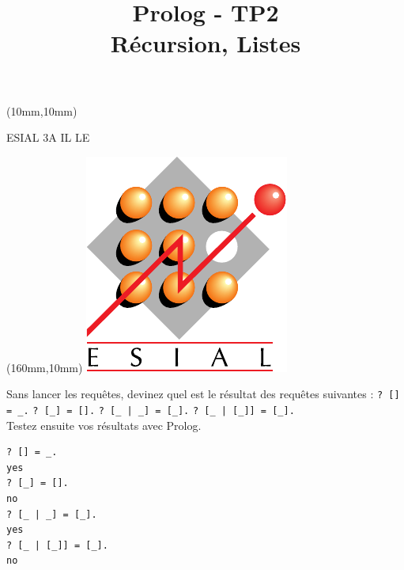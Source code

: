 \documentclass[a4paper]{article}
\title{Prolog - TP2\\Récursion, Listes}
\date{}
\newenvironment{CAnswer}{\color{red}\begin{Answer}}
                        {\end{Answer}}
\begin{document}
\maketitle
\begin{textblock*}{4cm}(10mm,10mm)
\begin{Large}ESIAL 3A IL LE\end{Large}
\end{textblock*}
\begin{textblock*}{3cm}(160mm,10mm)
\includegraphics[width=\textwidth]{../../ESIAL.pdf}
\end{textblock*}

\begin{Exercise}[title={Quelques tests}]
Sans lancer les requêtes, devinez quel est le résultat des requêtes suivantes :
\Question \verb$?­ [] = _.$
\Question \verb$?­ [_] = [].$
\Question \verb$?­ [_ | _] = [_].$
\Question \verb$?­ [_ | [_]] = [_].$\\
Testez ensuite vos résultats avec Prolog.
\end{Exercise}
\begin{CAnswer}
\begin{verbatim}
?­ [] = _.
yes
?­ [_] = [].
no
?­ [_ | _] = [_].
yes
?­ [_ | [_]] = [_].
no
\end{verbatim}
\end{CAnswer}
\end{document}
